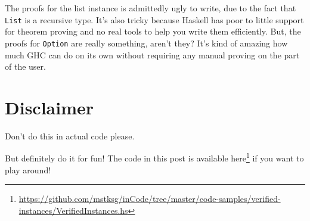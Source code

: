 \documentclass[]{article}
\renewcommand{\href}[2]{#2\footnote{\url{#1}}}
\begin{document}
The proofs for the list instance is admittedly ugly to write, due to the fact
that \texttt{List} is a recursive type. It's also tricky because Haskell has
poor to little support for theorem proving and no real tools to help you write
them efficiently. But, the proofs for \texttt{Option} are really something,
aren't they? It's kind of amazing how much GHC can do on its own without
requiring any manual proving on the part of the user.

\section{Disclaimer}\label{disclaimer}

Don't do this in actual code please.

But definitely do it for fun! The code in this post is available
\href{https://github.com/mstksg/inCode/tree/master/code-samples/verified-instances/VerifiedInstances.hs}{here}
if you want to play around!
\end{document}
